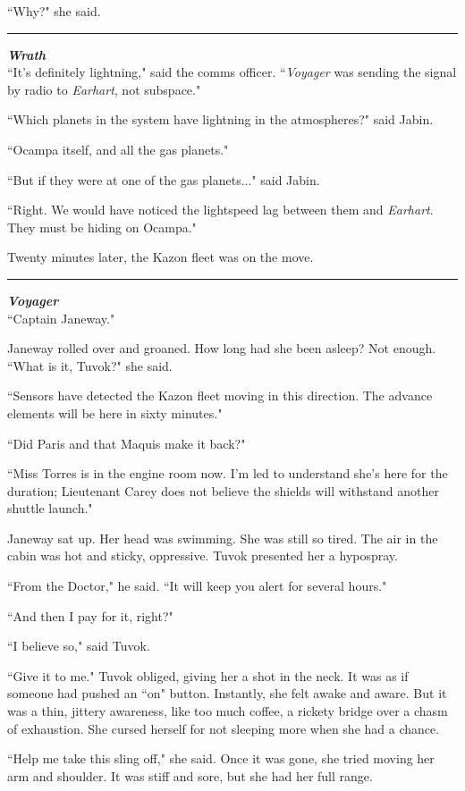 \documentclass[twoside,letterpaper,12pt]{memoir}
\begin{document}
``Why?" she said.

\fancybreak{\rule{3cm}{0.4 pt}}
\noindent\textit{\textbf{Wrath}}\\

``It's definitely lightning," said the comms officer. ``\textit{Voyager} was sending the signal by radio to \textit{Earhart}, not subspace."

``Which planets in the system have lightning in the atmospheres?" said Jabin.

``Ocampa itself, and all the gas planets."

``But if they were at one of the gas planets..." said Jabin.

``Right. We would have noticed the lightspeed lag between them and \textit{Earhart}. They must be hiding on Ocampa."

Twenty minutes later, the Kazon fleet was on the move.

\fancybreak{\rule{3cm}{0.4 pt}}
\noindent\textit{\textbf{Voyager}}\\

``Captain Janeway."

Janeway rolled over and groaned. How long had she been asleep? Not enough. ``What is it, Tuvok?" she said.

``Sensors have detected the Kazon fleet moving in this direction. The advance elements will be here in sixty minutes."

``Did Paris and that Maquis make it back?"

``Miss Torres is in the engine room now. I'm led to understand she's here for the duration; Lieutenant Carey does not believe the shields will withstand another shuttle launch."

Janeway sat up. Her head was swimming. She was still so tired. The air in the cabin was hot and sticky, oppressive. Tuvok presented her a hypospray.

``From the Doctor," he said. ``It will keep you alert for several hours."

``And then I pay for it, right?"

``I believe so," said Tuvok.

``Give it to me." Tuvok obliged, giving her a shot in the neck. It was as if someone had pushed an ``on" button. Instantly, she felt awake and aware. But it was a thin, jittery awareness, like too much coffee, a rickety bridge over a chasm of exhaustion. She cursed herself for not sleeping more when she had a chance.

``Help me take this sling off," she said. Once it was gone, she tried moving her arm and shoulder. It was stiff and sore, but she had her full range.
\end{document}

